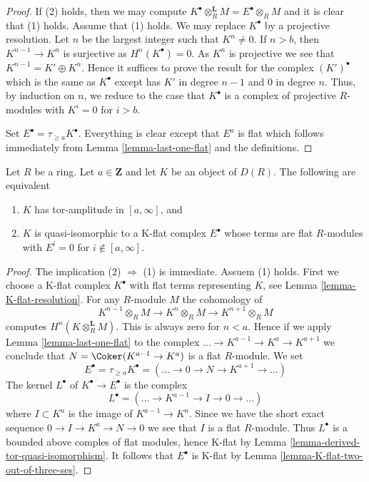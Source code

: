 \begin{proof}
If (2) holds, then we may compute
$K^\bullet \otimes_R^\mathbf{L} M = E^\bullet \otimes_R M$
and it is clear that (1) holds.
Assume that (1) holds. We may replace $K^\bullet$ by
a projective resolution.
Let $n$ be the largest integer such that $K^n \not = 0$.
If $n > b$, then $K^{n - 1} \to K^n$ is surjective as
$H^n(K^\bullet) = 0$. As $K^n$ is projective we see that
$K^{n - 1} = K' \oplus K^n$. Hence it suffices to prove the result
for the complex $(K')^\bullet$ which is the same as $K^\bullet$
except has $K'$ in degree $n - 1$ and $0$ in degree $n$.
Thus, by induction on $n$, we reduce to the case that $K^\bullet$
is a complex of projective $R$-modules with $K^i = 0$ for $i > b$.

\medskip\noindent
Set $E^\bullet = \tau_{\geq a}K^\bullet$. Everything is clear except
that $E^a$ is flat which follows immediately from
Lemma \ref{lemma-last-one-flat}
and the definitions.
\end{proof}

\begin{lemma}
\label{lemma-bounded-below-tor-amplitude}
Let $R$ be a ring. Let $a \in \mathbf{Z}$ and let $K$ be an object of $D(R)$.
The following are equivalent
\begin{enumerate}
\item $K$ has tor-amplitude in $[a, \infty]$, and
\item $K$ is quasi-isomorphic to a K-flat complex
$E^\bullet$ whose terms are flat $R$-modules with
$E^i = 0$ for $i \not \in [a, \infty]$.
\end{enumerate}
\end{lemma}

\begin{proof}
The implication (2) $\Rightarrow$ (1) is immediate. Assuem (1) holds.
First we choose a K-flat complex $K^\bullet$ with flat terms representing
$K$, see Lemma \ref{lemma-K-flat-resolution}.
For any $R$-module $M$ the cohomology of
$$
K^{n - 1} \otimes_R M \to K^n \otimes_R M \to K^{n + 1} \otimes_R M
$$
computes $H^n(K \otimes_R^\mathbf{L} M)$. This is always zero
for $n < a$. Hence if we apply Lemma \ref{lemma-last-one-flat}
to the complex $\ldots \to K^{a - 1} \to K^a \to K^{a + 1}$
we conclude that $N = \Coker(K^{a - 1} \to K^a)$ is a flat $R$-module.
We set
$$
E^\bullet = \tau_{\geq a}K^\bullet =
(\ldots \to 0 \to N \to K^{a + 1} \to \ldots )
$$
The kernel $L^\bullet$ of $K^\bullet \to E^\bullet$ is the complex
$$
L^\bullet = (\ldots \to K^{a - 1} \to I \to 0 \to \ldots)
$$
where $I \subset K^a$ is the image of $K^{a - 1} \to K^a$.
Since we have the short exact sequence $0 \to I \to K^a \to N \to 0$
we see that $I$ is a flat $R$-module. Thus $L^\bullet$ is a bounded
above comples of flat modules, hence K-flat by
Lemma \ref{lemma-derived-tor-quasi-isomorphism}.
It follows that $E^\bullet$ is K-flat by
Lemma \ref{lemma-K-flat-two-out-of-three-ses}.
\end{proof}


